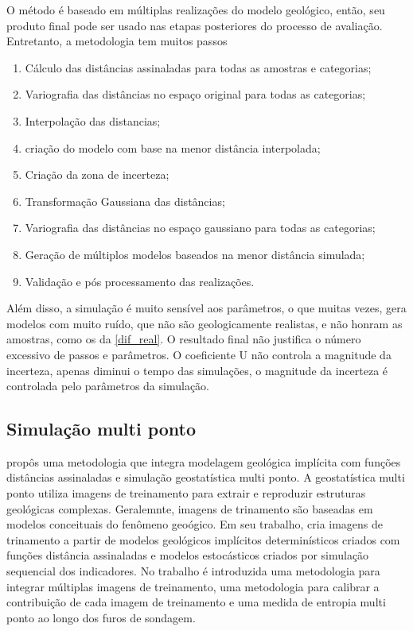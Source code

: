 O método é baseado em múltiplas realizações do modelo geológico, então, seu produto final pode ser usado nas etapas posteriores do processo de avaliação. Entretanto, a metodologia tem muitos passos \cite{radtke_dissertacao}

\begin{enumerate}
\item Cálculo das distâncias assinaladas para todas as amostras e categorias;
\item Variografia das distâncias no espaço original para todas as categorias;
\item Interpolação das distancias; 
\item criação do modelo com base na menor distância interpolada;
\item Criação da zona de incerteza;
\item Transformação Gaussiana das distâncias;
\item Variografia das distâncias no espaço gaussiano para todas as categorias;
\item Geração de múltiplos modelos baseados na menor distância simulada;
\item Validação e pós processamento das realizações.
\end{enumerate}

Além disso, a simulação é muito sensível aos parâmetros, o que muitas vezes, gera modelos com muito ruído, que não são geologicamente realistas, e não honram as amostras, como os da \autoref{dif_real}. O resultado final não justifica o número excessivo de passos e parâmetros. O coeficiente U não controla a magnitude da incerteza, apenas diminui o tempo das simulações, o magnitude da incerteza é controlada pelo parâmetros da simulação.

\subsection{Simulação multi ponto}

 propôs uma metodologia que integra modelagem geológica implícita com funções distâncias assinaladas e simulação geostatística multi ponto. A geostatística multi ponto utiliza imagens de treinamento para extrair e reproduzir estruturas geológicas complexas. Geralemnte, imagens de trinamento são baseadas em modelos conceituais do fenômeno geoógico. Em seu trabalho,  cria imagens de trinamento a partir de modelos geológicos implícitos determinísticos criados com funções distância assinaladas e modelos estocásticos criados por simulação sequencial dos indicadores. No trabalho é introduzida uma metodologia  para integrar múltiplas imagens de treinamento, uma metodologia para calibrar a contribuição de cada imagem de treinamento e uma medida de entropia multi ponto ao longo dos furos de sondagem.

